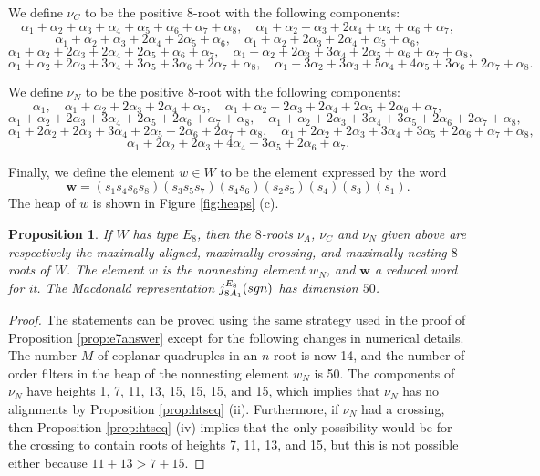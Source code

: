 \documentclass[11pt]{amsart}
\theoremstyle{plain}
\newtheorem{prop}[theorem]{Proposition}
\theoremstyle{definition}
\theoremstyle{remark}
\numberwithin{equation}{subsection}
\newcommand{\bfw}{\mathbf{w}}
\newcommand{\macd}[2]{j^{#1}_{#2}({\rm{sgn}})}
\begin{document}
We define $\nu_C$ to be the positive $8$-root with the following components: $$
\alpha_1 + \alpha_2 + \alpha_3 + \alpha_4 + \alpha_5 + \alpha_6 + \alpha_7 +
\alpha_8,\quad      \alpha_1 + \alpha_2 + \alpha_3 + 2\alpha_4 + \alpha_5 +
\alpha_6 + \alpha_7, $$ $$ \alpha_1 + \alpha_2 + \alpha_3 + 2\alpha_4 +
2\alpha_5 + \alpha_6,\quad \alpha_1 + \alpha_2 + 2\alpha_3 + 2\alpha_4 +
\alpha_5 + \alpha_6, $$ $$ \alpha_1 + \alpha_2 + 2\alpha_3 + 2\alpha_4 +
2\alpha_5 + \alpha_6 + \alpha_7,\quad \alpha_1 + \alpha_2 + 2\alpha_3 +
3\alpha_4 + 2\alpha_5 + \alpha_6 + \alpha_7 + \alpha_8, $$ $$ \alpha_1 +
\alpha_2 + 2\alpha_3 + 3\alpha_4 + 3\alpha_5 + 3\alpha_6 + 2\alpha_7 +
\alpha_8,\quad \alpha_1 + 3\alpha_2 + 3\alpha_3 + 5\alpha_4 + 4\alpha_5 +
3\alpha_6 + 2\alpha_7 + \alpha_8.  $$

We define $\nu_N$ to be the positive $8$-root with the following components: $$
\alpha_1,\quad \alpha_1 + \alpha_2 + 2\alpha_3 + 2\alpha_4 + \alpha_5,\quad
\alpha_1 + \alpha_2 + 2\alpha_3 + 2\alpha_4 + 2\alpha_5 + 2\alpha_6 + \alpha_7,
$$ $$ \alpha_1 + \alpha_2 + 2\alpha_3 + 3\alpha_4 + 2\alpha_5 + 2\alpha_6 +
\alpha_7 + \alpha_8,\quad \alpha_1 + \alpha_2 + 2\alpha_3 + 3\alpha_4 +
3\alpha_5 + 2\alpha_6 + 2\alpha_7 + \alpha_8, $$ $$ \alpha_1 + 2\alpha_2 +
2\alpha_3 + 3\alpha_4 + 2\alpha_5 + 2\alpha_6 + 2\alpha_7 + \alpha_8,\quad
\alpha_1 + 2\alpha_2 + 2\alpha_3 + 3\alpha_4 + 3\alpha_5 + 2\alpha_6 + \alpha_7
+ \alpha_8, $$ $$ \alpha_1 + 2\alpha_2 + 2\alpha_3 + 4\alpha_4 + 3\alpha_5 +
2\alpha_6 + \alpha_7 .$$

Finally, we define the element $w\in W$ to be the element expressed by the word
$$\bfw = (s_1s_4s_6s_8)(s_3s_5s_7)(s_4s_6)(s_2s_5)(s_4)(s_3)(s_1).$$ The heap of
$w$ is shown in Figure \ref{fig:heaps} (c).

\begin{prop}\label{prop:e8answer}
If $W$ has type $E_8$, then the $8$-roots $\nu_A$, $\nu_C$ and $\nu_N$ given
above are respectively the maximally aligned, maximally crossing, and maximally
nesting $8$-roots of $W$.  The element $w$ is the nonnesting element $w_N$, and $\bfw$
a reduced word for it.  The Macdonald representation $\macd{E_8}{8A_1}$ has
dimension $50$.
\end{prop}

\begin{proof}
The statements can be proved using the same strategy used in the proof of
Proposition \ref{prop:e7answer} except for the following changes in numerical
details. The number $M$ of coplanar quadruples in an $n$-root is now 14, and the
number of order filters in the heap of the nonnesting element $w_N$ is 50. The
components of $\nu_N$ have heights 1, 7, 11, 13, 15, 15, 15,
and 15, which implies that $\nu_N$ has no alignments by Proposition
\ref{prop:htseq} (ii).  Furthermore, if $\nu_N$ had a crossing, then Proposition
\ref{prop:htseq} (iv) implies that the only possibility would be for the crossing
to contain roots of heights 7, 11, 13, and 15, but this is not possible
either because $11+13 > 7+15$.
\end{proof}
\end{document}

